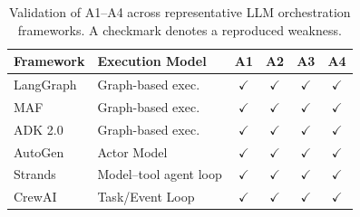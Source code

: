 \begin{table}[t]
\centering
\small
\caption{Validation of A1--A4 across representative LLM orchestration
frameworks. A checkmark denotes a reproduced weakness.}
\label{tab:framework-validation}
\begin{tabular}{llcccc}
\toprule
\textbf{Framework} & \textbf{Execution Model} &
\textbf{A1} & \textbf{A2} & \textbf{A3} & \textbf{A4} \\
\midrule
LangGraph~\cite{langgraph}
    & Graph-based exec.
    & $\checkmark$ & $\checkmark$ & $\checkmark$ & $\checkmark$ \\
MAF~\cite{microsoft-agent-framework}
    & Graph-based exec.
    & $\checkmark$ & $\checkmark$ & $\checkmark$ & $\checkmark$ \\
ADK 2.0~\cite{google-adk2}
    & Graph-based exec.
    & $\checkmark$ & $\checkmark$ & $\checkmark$ & $\checkmark$ \\
AutoGen~\cite{autogen}
    & Actor Model
    & $\checkmark$ & $\checkmark$ & $\checkmark$ & $\checkmark$ \\
Strands~\cite{strands}
    & Model--tool agent loop
    & $\checkmark$ & $\checkmark$ & $\checkmark$ & $\checkmark$ \\
CrewAI~\cite{crewai}
    & Task/Event Loop
    & $\checkmark$ & $\checkmark$ & $\checkmark$ & $\checkmark$ \\
\bottomrule
\end{tabular}
\end{table}
